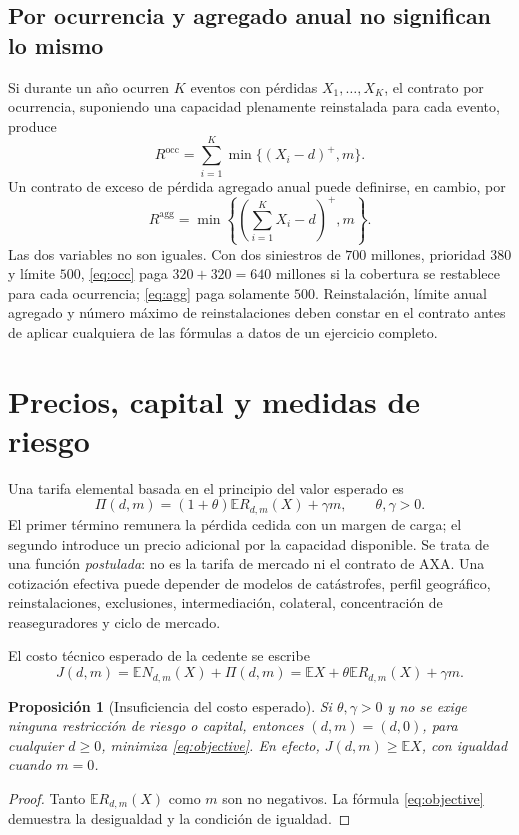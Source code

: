 \documentclass[11pt,reqno]{amsart}
\newtheorem{proposition}[theorem]{Proposición}
\theoremstyle{definition}\newtheorem{definition}[theorem]{Definición}
\theoremstyle{remark}\newtheorem{remark}[theorem]{Observación}
\newcommand{\E}{\mathbb E}
\newcommand{\pos}[1]{(#1)^+}
\begin{document}
\subsection{Por ocurrencia y agregado anual no significan lo mismo}
Si durante un año ocurren $K$ eventos con pérdidas $X_1,\ldots,X_K$, el contrato por ocurrencia, suponiendo una capacidad plenamente reinstalada para cada evento, produce
\begin{equation}\label{eq:occ}
R^{\mathrm{occ}}=\sum_{i=1}^K\min\{\pos{X_i-d},m\}.
\end{equation}
Un contrato de exceso de pérdida agregado anual puede definirse, en cambio, por
\begin{equation}\label{eq:agg}
R^{\mathrm{agg}}=\min\left\{\pos{\sum_{i=1}^K X_i-d},m\right\}.
\end{equation}
Las dos variables no son iguales. Con dos siniestros de $700$ millones, prioridad $380$ y límite $500$, \eqref{eq:occ} paga $320+320=640$ millones si la cobertura se restablece para cada ocurrencia; \eqref{eq:agg} paga solamente $500$. Reinstalación, límite anual agregado y número máximo de reinstalaciones deben constar en el contrato antes de aplicar cualquiera de las fórmulas a datos de un ejercicio completo.

\section{Precios, capital y medidas de riesgo}
Una tarifa elemental basada en el principio del valor esperado es
\begin{equation}\label{eq:premium}
\Pi(d,m)=(1+\theta)\E R_{d,m}(X)+\gamma m,
\qquad \theta,\gamma>0.
\end{equation}
El primer término remunera la pérdida cedida con un margen de carga; el segundo introduce un precio adicional por la capacidad disponible. Se trata de una función \emph{postulada}: no es la tarifa de mercado ni el contrato de AXA. Una cotización efectiva puede depender de modelos de catástrofes, perfil geográfico, reinstalaciones, exclusiones, intermediación, colateral, concentración de reaseguradores y ciclo de mercado.

El costo técnico esperado de la cedente se escribe
\begin{equation}\label{eq:objective}
J(d,m)=\E N_{d,m}(X)+\Pi(d,m)
=\E X+\theta\E R_{d,m}(X)+\gamma m.
\end{equation}
\begin{proposition}[Insuficiencia del costo esperado]
Si $\theta,\gamma>0$ y no se exige ninguna restricción de riesgo o capital, entonces $(d,m)=(d,0)$, para cualquier $d\ge0$, minimiza \eqref{eq:objective}. En efecto, $J(d,m)\ge\E X$, con igualdad cuando $m=0$.
\end{proposition}
\begin{proof}
Tanto $\E R_{d,m}(X)$ como $m$ son no negativos. La fórmula \eqref{eq:objective} demuestra la desigualdad y la condición de igualdad.
\end{proof}
\end{document}
